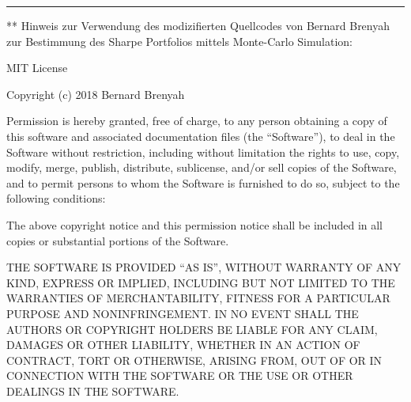 \documentclass[paper=landscape]{scrartcl}
\begin{document}
    \begin{center}\rule{0.5\linewidth}{\linethickness}\end{center}

** Hinweis zur Verwendung des modizifierten Quellcodes von Bernard
Brenyah zur Bestimmung des Sharpe Portfolios mittels Monte-Carlo
Simulation:

MIT License

Copyright (c) 2018 Bernard Brenyah

Permission is hereby granted, free of charge, to any person obtaining a
copy of this software and associated documentation files (the
``Software''), to deal in the Software without restriction, including
without limitation the rights to use, copy, modify, merge, publish,
distribute, sublicense, and/or sell copies of the Software, and to
permit persons to whom the Software is furnished to do so, subject to
the following conditions:

The above copyright notice and this permission notice shall be included
in all copies or substantial portions of the Software.

THE SOFTWARE IS PROVIDED ``AS IS'', WITHOUT WARRANTY OF ANY KIND,
EXPRESS OR IMPLIED, INCLUDING BUT NOT LIMITED TO THE WARRANTIES OF
MERCHANTABILITY, FITNESS FOR A PARTICULAR PURPOSE AND NONINFRINGEMENT.
IN NO EVENT SHALL THE AUTHORS OR COPYRIGHT HOLDERS BE LIABLE FOR ANY
CLAIM, DAMAGES OR OTHER LIABILITY, WHETHER IN AN ACTION OF CONTRACT,
TORT OR OTHERWISE, ARISING FROM, OUT OF OR IN CONNECTION WITH THE
SOFTWARE OR THE USE OR OTHER DEALINGS IN THE SOFTWARE.


    
    
    
    
\end{document}
